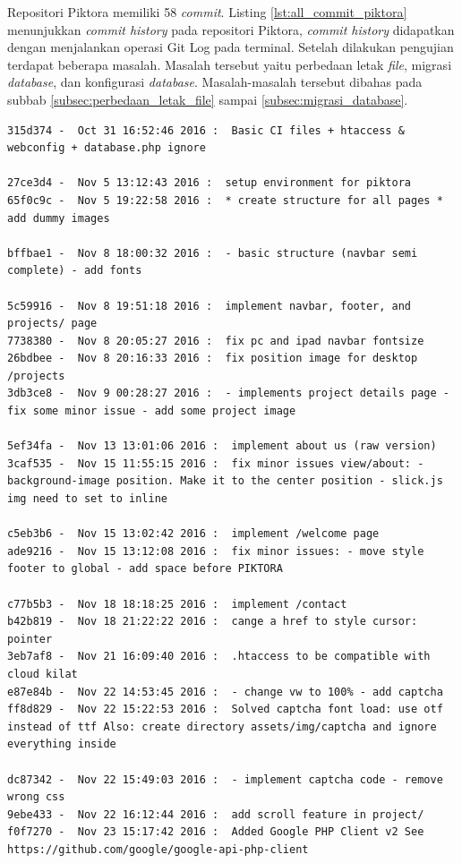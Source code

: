 Repositori Piktora memiliki 58 \textit{commit}. Listing \ref{lst:all_commit_piktora} menunjukkan \textit{commit history} pada repositori Piktora, \textit{commit history} didapatkan dengan menjalankan operasi Git Log pada terminal. Setelah dilakukan pengujian terdapat beberapa masalah. Masalah tersebut yaitu perbedaan letak \textit{file}, migrasi \textit{database}, dan konfigurasi \textit{database}. Masalah-masalah tersebut dibahas pada subbab \ref{subsec:perbedaan_letak_file} sampai \ref{subsec:migrasi_database}.

\begin{lstlisting}[caption={\textit{Commit history} pada proyek Piktora},label={lst:all_commit_piktora},language=plaintext]
315d374 -  Oct 31 16:52:46 2016 :  Basic CI files + htaccess & webconfig + database.php ignore

27ce3d4 -  Nov 5 13:12:43 2016 :  setup environment for piktora
65f0c9c -  Nov 5 19:22:58 2016 :  * create structure for all pages * add dummy images

bffbae1 -  Nov 8 18:00:32 2016 :  - basic structure (navbar semi complete) - add fonts

5c59916 -  Nov 8 19:51:18 2016 :  implement navbar, footer, and projects/ page
7738380 -  Nov 8 20:05:27 2016 :  fix pc and ipad navbar fontsize
26bdbee -  Nov 8 20:16:33 2016 :  fix position image for desktop /projects
3db3ce8 -  Nov 9 00:28:27 2016 :  - implements project details page - fix some minor issue - add some project image

5ef34fa -  Nov 13 13:01:06 2016 :  implement about us (raw version)
3caf535 -  Nov 15 11:55:15 2016 :  fix minor issues view/about: - background-image position. Make it to the center position - slick.js img need to set to inline

c5eb3b6 -  Nov 15 13:02:42 2016 :  implement /welcome page
ade9216 -  Nov 15 13:12:08 2016 :  fix minor issues: - move style footer to global - add space before PIKTORA

c77b5b3 -  Nov 18 18:18:25 2016 :  implement /contact
b42b819 -  Nov 18 21:22:22 2016 :  cange a href to style cursor: pointer
3eb7af8 -  Nov 21 16:09:40 2016 :  .htaccess to be compatible with cloud kilat
e87e84b -  Nov 22 14:53:45 2016 :  - change vw to 100% - add captcha
ff8d829 -  Nov 22 15:22:53 2016 :  Solved captcha font load: use otf instead of ttf Also: create directory assets/img/captcha and ignore everything inside

dc87342 -  Nov 22 15:49:03 2016 :  - implement captcha code - remove wrong css
9ebe433 -  Nov 22 16:12:44 2016 :  add scroll feature in project/
f0f7270 -  Nov 23 15:17:42 2016 :  Added Google PHP Client v2 See https://github.com/google/google-api-php-client


\end{lstlisting}
